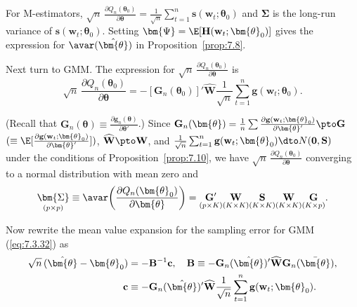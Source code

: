 For M-estimators, $\sqrt{n}\,\frac{\partial Q_n(\bm{\theta}_0)}{\partial\bm{\theta}} = \frac{1}{\sqrt{n}}\sum_{t=1}^{n}\mathbf{s}(\mathbf{w}_t; \bm{\theta}_0)$ and $\bm{\Sigma}$ is the long-run variance of $\mathbf{s}(\mathbf{w}_t; \bm{\theta}_0)$. Setting $\bm{\Psi} = \E[\mathbf{H}(\mathbf{w}_t; \bm{\theta}_0)]$ gives the expression for $\avar(\hat{\bm{\theta}})$ in Proposition~\ref{prop:7.8}.

Next turn to GMM. The expression for $\sqrt{n}\,\frac{\partial Q_n(\bm{\theta}_0)}{\partial\bm{\theta}}$ is
\begin{equation}
\label{eq:7.3.45}
\sqrt{n}\,\frac{\partial Q_n(\bm{\theta}_0)}{\partial\bm{\theta}} = -[\mathbf{G}_n(\bm{\theta}_0)]'\widehat{\mathbf{W}}\frac{1}{\sqrt{n}}\sum_{t=1}^{n}\mathbf{g}(\mathbf{w}_t; \bm{\theta}_0).
\end{equation}

(Recall that $\mathbf{G}_n(\bm{\theta}) \equiv \frac{\partial\mathbf{g}_n(\bm{\theta})}{\partial\bm{\theta}'}$.) Since $\mathbf{G}_n(\bm{\theta}) = \frac{1}{n}\sum \frac{\partial\mathbf{g}(\mathbf{w}_t; \bm{\theta}_0)}{\partial\bm{\theta}'} \pto \mathbf{G}$ $(\equiv \E[\frac{\partial\mathbf{g}(\mathbf{w}_t; \bm{\theta}_0)}{\partial\bm{\theta}'}])$, $\widehat{\mathbf{W}} \pto \mathbf{W}$, and $\frac{1}{\sqrt{n}}\sum_{t=1}^{n}\mathbf{g}(\mathbf{w}_t; \bm{\theta}_0) \dto N(\mathbf{0}, \mathbf{S})$ under the conditions of Proposition~\ref{prop:7.10}, we have $\sqrt{n}\,\frac{\partial Q_n(\bm{\theta}_0)}{\partial\bm{\theta}}$ converging to a normal distribution with mean zero and
\begin{equation}
\label{eq:7.3.46}
\underset{(p \times p)}{\bm{\Sigma}} \equiv \avar\!\left(\frac{\partial Q_n(\bm{\theta}_0)}{\partial\bm{\theta}}\right) = \underset{(p \times K)}{\mathbf{G}'}\underset{(K \times K)}{\mathbf{W}}\underset{(K \times K)}{\mathbf{S}}\underset{(K \times K)}{\mathbf{W}}\underset{(K \times p)}{\mathbf{G}}.
\end{equation}

Now rewrite the mean value expansion for the sampling error for GMM (\ref{eq:7.3.32}) as
\begin{align}
\label{eq:7.3.47}
\sqrt{n}\,(\hat{\bm{\theta}} - \bm{\theta}_0) &= -\mathbf{B}^{-1}\mathbf{c}, \quad \mathbf{B} \equiv -\mathbf{G}_n(\hat{\bm{\theta}})'\widehat{\mathbf{W}}\mathbf{G}_n(\bar{\bm{\theta}}), \notag\\
\mathbf{c} &\equiv -\mathbf{G}_n(\hat{\bm{\theta}})'\widehat{\mathbf{W}}\frac{1}{\sqrt{n}}\sum_{t=1}^{n}\mathbf{g}(\mathbf{w}_t; \bm{\theta}_0).
\end{align}


